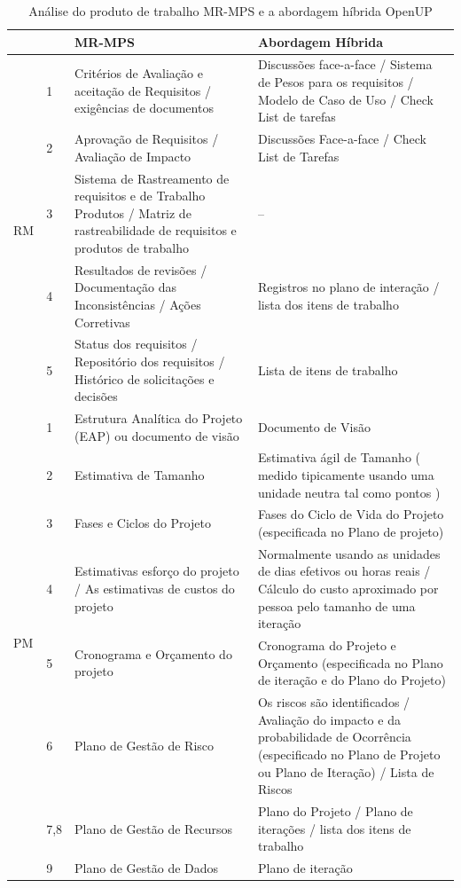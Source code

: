 \documentclass{acm_proc_article-sp}
\begin{document}
\begin{table}[h]
\scriptsize
\caption{Análise do produto de trabalho MR-MPS e a abordagem híbrida OpenUP \cite{Arimoto:melhoria}} 
\centering
\begin{tabular}{|p{10mm}|p{10mm}|p{70mm}|p{70mm}|}
\hline
 &  & MR-MPS & Abordagem Híbrida \\
\hline
\multirow{5}{*}{RM} & 1 & Critérios de Avaliação e aceitação de Requisitos / exigências de documentos & 
Discussões face-a-face / Sistema de Pesos para os requisitos / Modelo de Caso de Uso / Check List de tarefas\\
& 2 & Aprovação de Requisitos / Avaliação de Impacto & Discussões Face-a-face / Check List de Tarefas \\
& 3 & Sistema de Rastreamento de requisitos e de Trabalho Produtos / Matriz de rastreabilidade de requisitos e produtos de trabalho
& -- \\
& 4 & Resultados de revisões / Documentação das Inconsistências / Ações Corretivas & Registros no plano de interação / lista dos itens de trabalho \\
& 5 & Status dos requisitos / Repositório dos requisitos / Histórico de solicitações e decisões & Lista de itens de trabalho \\
\hline
\multirow{14}{*}{PM} & 1 & Estrutura Analítica do Projeto (EAP) ou documento de visão & Documento de Visão \\
& 2 & Estimativa de Tamanho &  Estimativa ágil de Tamanho ( medido tipicamente usando uma unidade neutra tal como pontos ) \\
& 3 & Fases e Ciclos do Projeto & Fases do Ciclo de Vida do Projeto (especificada no Plano de projeto) \\
& 4 & Estimativas esforço do projeto / As estimativas de custos do projeto & Normalmente usando as unidades de dias efetivos ou horas reais / Cálculo do custo aproximado por pessoa pelo tamanho de uma iteração \\
& 5 & Cronograma e Orçamento do projeto & Cronograma do Projeto e Orçamento (especificada no Plano de iteração e do Plano do Projeto) \\
& 6 & Plano de Gestão de Risco & Os riscos são identificados / Avaliação do impacto e da probabilidade de Ocorrência (especificado no Plano de Projeto ou Plano de Iteração) / Lista de Riscos \\
& 7,8 & Plano de Gestão de Recursos & Plano do Projeto / Plano de iterações / lista dos itens de trabalho \\
& 9 & Plano de Gestão de Dados & Plano de iteração \\

\end{tabular}
\end{table}
\end{document}
